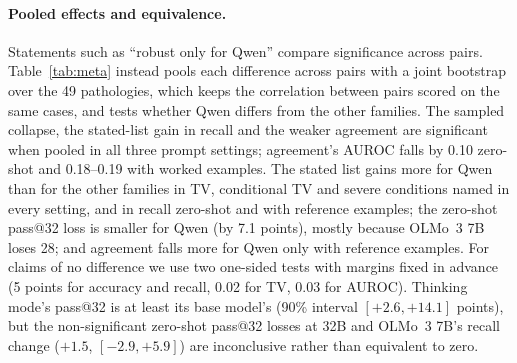 \documentclass[11pt]{article}
\begin{document}
\begin{table}[t]
\begin{adjustbox}{max width=\linewidth}
\end{adjustbox}
\caption{Base $\rightarrow$ post-trained (final Instruct) differences on DDXPlus with 95\% intervals from a bootstrap over the 49 true-pathology clusters. $\dagger$: not significant after Holm correction across 112 tests (50,000 resamples, add-one p-values). pass@32 here is recomputed from the samples with the analysis scripts' name matching and can differ from Table~\ref{tab:pairs} by up to 0.3 points; the AUROC differences come from the same script and differ from those implied by Table~\ref{tab:consequences} by up to 0.005.}
\label{tab:clustered}
\end{table}

\paragraph{Pooled effects and equivalence.} Statements such as ``robust only for Qwen'' compare significance across pairs. Table~\ref{tab:meta} instead pools each difference across pairs with a joint bootstrap over the 49 pathologies, which keeps the correlation between pairs scored on the same cases, and tests whether Qwen differs from the other families. The sampled collapse, the stated-list gain in recall and the weaker agreement are significant when pooled in all three prompt settings; agreement's AUROC falls by 0.10 zero-shot and 0.18--0.19 with worked examples. The stated list gains more for Qwen than for the other families in TV, conditional TV and severe conditions named in every setting, and in recall zero-shot and with reference examples; the zero-shot pass@32 loss is smaller for Qwen (by 7.1 points), mostly because OLMo~3 7B loses 28; and agreement falls more for Qwen only with reference examples. For claims of no difference we use two one-sided tests with margins fixed in advance (5 points for accuracy and recall, 0.02 for TV, 0.03 for AUROC). Thinking mode's pass@32 is at least its base model's (90\% interval $[+2.6,+14.1]$ points), but the non-significant zero-shot pass@32 losses at 32B and OLMo~3 7B's recall change ($+1.5$, $[-2.9,+5.9]$) are inconclusive rather than equivalent to zero.
\end{document}
